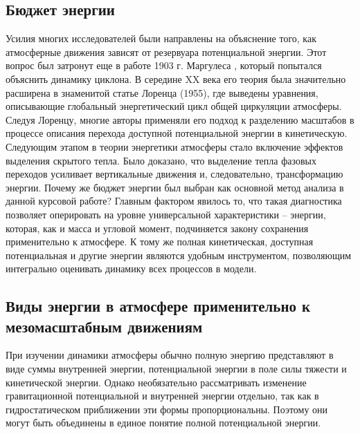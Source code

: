 \documentclass[12pt,a4paper]{report}
\begin{document}
\subsection{Бюджет энергии}
Усилия многих исследователей были направлены на объяснение того, как атмосферные движения зависят от резервуара потенциальной энергии. Этот вопрос был затронут еще в работе 1903 г. Маргулеса \citep{Nagata1993}, который попытался объяснить динамику циклона. В середине XX века его теория была значительно расширена в знаменитой статье Лоренца (1955), где выведены уравнения, описывающие глобальный энергетический цикл общей циркуляции атмосферы. Следуя Лоренцу, многие авторы применяли его подход к разделению масштабов в процессе описания перехода доступной потенциальной энергии в кинетическую. Следующим этапом в теории энергетики атмосферы стало включение эффектов выделения скрытого тепла. Было доказано, что выделение тепла фазовых переходов усиливает вертикальные движения и, следовательно, трансформацию энергии.
Почему же бюджет энергии был выбран как основной метод анализа в данной курсовой работе? Главным фактором явилось то, что такая диагностика позволяет оперировать на уровне универсальной характеристики -- энергии, которая, как и масса и угловой момент, подчиняется закону сохранения применительно к атмосфере. К тому же полная кинетическая, доступная потенциальная и другие энергии являются удобным инструментом, позволяющим интегрально оценивать динамику всех процессов в модели.

\subsection{Виды энергии в атмосфере применительно к мезомасштабным движениям}
При изучении динамики атмосферы обычно полную энергию представляют в виде суммы внутренней энергии, потенциальной энергии в поле силы тяжести и кинетической энергии. Однако необязательно рассматривать изменение гравитационной потенциальной и внутренней энергии отдельно, так как в гидростатическом приближении эти формы пропорциональны. Поэтому они могут быть объединены в единое понятие полной потенциальной энергии.




\end{document}
